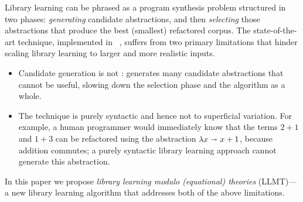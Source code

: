 Library learning can be phrased as a program synthesis problem
 structured in two phases:
\emph{generating} candidate abstractions, and then
\emph{selecting} those abstractions that produce the best (smallest)
     refactored corpus.
The state-of-the-art technique, implemented in \dc~\cite{dreamcoder},
  suffers from two primary limitations %
  that hinder scaling library learning to larger and more realistic inputs.
\begin{itemize}
    \item
    Candidate generation is not :
    \dc generates many candidate abstractions that cannot be useful,
    slowing down the selection phase and the algorithm as a whole.
    \item
    The technique is purely syntactic and hence not  to superficial variation.
    For example,
     a human programmer would immediately know that the terms $2 + 1$ and $1 + 3$
     can be refactored using the abstraction $\lambda x \ \mathbf{\shortrightarrow}\  x + 1$,
     because addition commutes;
     a purely syntactic library learning approach cannot generate this abstraction.
\end{itemize}
In this paper we propose \emph{library learning modulo (equational) theories} (LLMT)---%
a new library learning algorithm
that addresses both of the above limitations.

